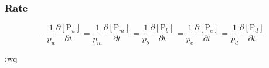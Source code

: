 \documentclass[12pt, a4paper]{article}
\begin{document}
\subsubsection{Rate}
\begin{equation}
-\frac{1}{p_u}\frac{\partial [\text{P}_u]}{\partial t} = \frac{1}{p_m}\frac{\partial [\text{P}_m]}{\partial t} = \frac{1}{p_b} \frac{\partial [\text{P}_b]}{\partial t} = \frac{1}{p_e} \frac{\partial [\text{P}_e]}{\partial t} = \frac{1}{p_d}\frac{\partial [\text{P}_d]}{\partial t}
\end{equation}

:wq




\clearpage


\end{document}
